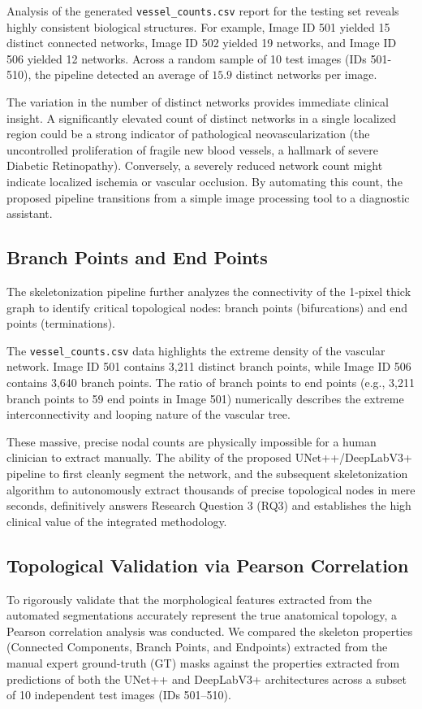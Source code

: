 Analysis of the generated \texttt{vessel\_counts.csv} report for the testing set reveals highly consistent biological structures. For example, Image ID 501 yielded 15 distinct connected networks, Image ID 502 yielded 19 networks, and Image ID 506 yielded 12 networks. Across a random sample of 10 test images (IDs 501-510), the pipeline detected an average of $15.9$ distinct networks per image. 

The variation in the number of distinct networks provides immediate clinical insight. A significantly elevated count of distinct networks in a single localized region could be a strong indicator of pathological neovascularization (the uncontrolled proliferation of fragile new blood vessels, a hallmark of severe Diabetic Retinopathy). Conversely, a severely reduced network count might indicate localized ischemia or vascular occlusion. By automating this count, the proposed pipeline transitions from a simple image processing tool to a diagnostic assistant.

\subsection{Branch Points and End Points}
The skeletonization pipeline further analyzes the connectivity of the 1-pixel thick graph to identify critical topological nodes: branch points (bifurcations) and end points (terminations). 

The \texttt{vessel\_counts.csv} data highlights the extreme density of the vascular network. Image ID 501 contains 3,211 distinct branch points, while Image ID 506 contains 3,640 branch points. The ratio of branch points to end points (e.g., 3,211 branch points to 59 end points in Image 501) numerically describes the extreme interconnectivity and looping nature of the vascular tree. 

These massive, precise nodal counts are physically impossible for a human clinician to extract manually. The ability of the proposed UNet++/DeepLabV3+ pipeline to first cleanly segment the network, and the subsequent skeletonization algorithm to autonomously extract thousands of precise topological nodes in mere seconds, definitively answers Research Question 3 (RQ3) and establishes the high clinical value of the integrated methodology.

\subsection{Topological Validation via Pearson Correlation}
To rigorously validate that the morphological features extracted from the automated segmentations accurately represent the true anatomical topology, a Pearson correlation analysis was conducted. We compared the skeleton properties (Connected Components, Branch Points, and Endpoints) extracted from the manual expert ground-truth (GT) masks against the properties extracted from predictions of both the UNet++ and DeepLabV3+ architectures across a subset of 10 independent test images (IDs 501–510).


